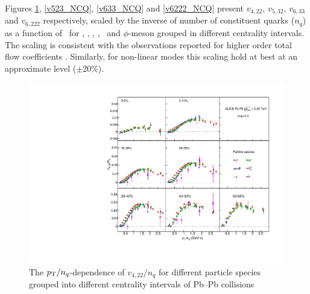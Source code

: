 
Figures \ref{v422_NCQ}, \ref{v523_NCQ}, \ref{v633_NCQ} and \ref{v6222_NCQ} present $v_{4,22}$, $v_{5,32}$, $v_{6,33}$ and $v_{6,222}$ respectively, scaled by the inverse of number of constituent quarks ($n_{q}$) as a function of \pTnq~for \pion, \kaon, \proton, \Ks, \lambdas~and $\phi$-meson grouped in different centrality intervals. The scaling is consistent with the observations reported for higher order total flow coefficients \cite{Acharya:2018zuq}. Similarly, for non-linear modes this scaling hold at best at an approximate level ($\pm$20\%). 

\begin{figure}[!htb]
\begin{center}
\includegraphics[scale=0.82]{figures/scaling/All_v422_gap00_NCQ_3by3.pdf}
\end{center}
\caption{The $p_{\rm{T}}/n_{q}$-dependence of $v_{4,22}/n_{q}$ for different particle species grouped into different centrality intervals of Pb--Pb collisions \sNN}
\label{v422_NCQ}
\end{figure}


